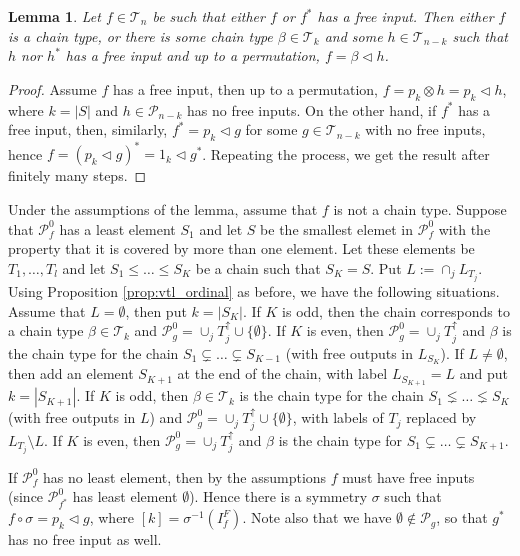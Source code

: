 \documentclass[12pt]{article}
\newtheorem{lemma}{Lemma}
\theoremstyle{definition}
\theoremstyle{remark}
\def\Te{\mathcal T}
\def\Pe{\mathcal P}
\def\vtl{\vartriangleleft}
\begin{document}
\begin{lemma}\label{lemma:pf0_smallest} Let $f\in \Te_n$ be such that either $f$ or
$f^*$ has a free input. 
Then either $f$ is a chain type, or there is some chain type $\beta\in
\Te_k$ and some $h\in \Te_{n-k}$ such that $h$ nor $h^*$ has a free input and up to a permutation, $f=\beta\vtl
h$. 

\end{lemma}


\begin{proof} Assume $f$ has a free input, then up to  a permutation, $f=p_k\otimes
h=p_k\vtl h$,
where $k=|S|$ and $h\in \Pe_{n-k}$ has no free inputs. On the other hand, if $f^*$ has a
free input, then, similarly, $f^*=p_k\vtl g$ for some $g\in \Te_{n-k}$ with no free
inputs, hence $f=(p_k\vtl g)^*=1_k\vtl g^*$. Repeating the process, we get the result
after finitely many steps.


\end{proof}

Under the assumptions of the lemma, assume that $f$ is not a chain type. 
Suppose that $\Pe_f^0$ has a least element $S_1$ and let $S$ be the smallest elemet in
$\Pe_f^0$ with the property that it is covered by more than one element. Let these
elements be $T_1,\dots, T_l$ and let  $S_1\le \dots \le S_K$ be a chain such that $S_K=S$.
Put $L:=\cap_j L_{T_j}$. 
Using
Proposition \ref{prop:vtl_ordinal} as before, we have the following situations. Assume
that  $L=\emptyset$, then put  $k=|S_K|$. If $K$ is odd, then the chain corresponds to a chain type
$\beta\in \Te_{k}$ and $\Pe_g^0=\cup_j T_j^{\uparrow}\cup\{\emptyset\}$. If $K$ is even, then $\Pe_g^0=\cup_j T_j^{\uparrow}$ and $\beta$
is the chain type for the chain $S_1\subsetneq \dots\subsetneq S_{K-1}$ (with free outputs
in $L_{S_K}$). If $L\ne \emptyset$, then add an element $S_{K+1}$ at the end of the chain, with label
$L_{S_{K+1}}=L$ and put $k=|S_{K+1}|$. If $K$ is odd, then $\beta\in \Te_k$ is the chain type for the chain
$S_1\lneq \dots \lneq S_K$ (with free outputs in $L$) and $\Pe_g^0=\cup_j
T_j^{\uparrow}\cup \{\emptyset\}$, with labels of $T_j$ replaced by $L_{T_j}\setminus L$.  If
$K$ is even, then $\Pe_g^0=\cup_j T_j^{\uparrow}$ and $\beta$ is the chain type  for
$S_1\subsetneq\dots\subsetneq S_{K+1}$.

If $\Pe_f^0$ has no least element, then by the assumptions $f$ must have free inputs (since $\Pe_{f^*}^0$
has least element $\emptyset$). Hence there is a symmetry $\sigma$ such that  $f\circ
\sigma=p_k\vtl g$, where  $[k]=\sigma^{-1}(I_f^F)$. Note also that we have  $\emptyset
\notin \Pe_g$, so that $g^*$ has no free input as well. 
\end{document}
